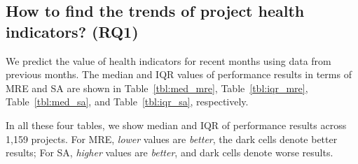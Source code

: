 \documentclass[smallextended]{svjour3}
\newcommand{\bi}{\begin{itemize}}
\newcommand{\ei}{\end{itemize}}
\begin{document}
\subsection{How to find the trends of project health indicators? (RQ1)}




We predict the value of health indicators for recent months using data from previous months.
The median and IQR values of performance results in terms of MRE and SA are shown in Table~\ref{tbl:med_mre}, Table~\ref{tbl:iqr_mre},  Table~\ref{tbl:med_sa}, and Table~\ref{tbl:iqr_sa}, respectively.

In all these four tables, we show median  and IQR of performance results across 1,159 projects.
For MRE, {\em lower} values are {\em better}, the dark cells denote better results; For SA, {\em higher} values are {\em better}, and dark cells denote worse results.
\end{document}
